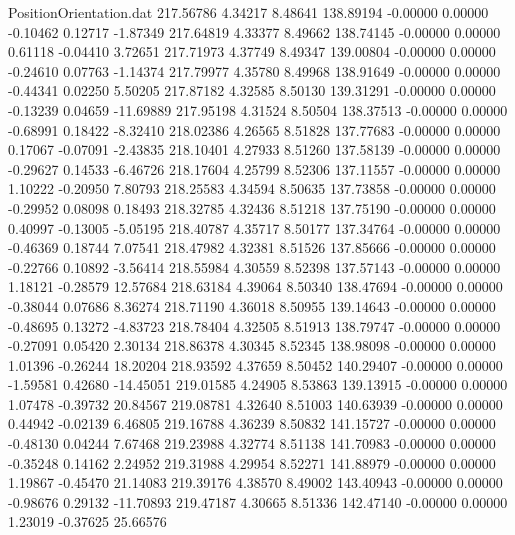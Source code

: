 \begin{filecontents}{PositionOrientation.dat}
 217.56786    4.34217    8.48641   138.89194   -0.00000    0.00000   -0.10462    0.12717   -1.87349
 217.64819    4.33377    8.49662   138.74145   -0.00000    0.00000    0.61118   -0.04410    3.72651
 217.71973    4.37749    8.49347   139.00804   -0.00000    0.00000   -0.24610    0.07763   -1.14374
 217.79977    4.35780    8.49968   138.91649   -0.00000    0.00000   -0.44341    0.02250    5.50205
 217.87182    4.32585    8.50130   139.31291   -0.00000    0.00000   -0.13239    0.04659  -11.69889
 217.95198    4.31524    8.50504   138.37513   -0.00000    0.00000   -0.68991    0.18422   -8.32410
 218.02386    4.26565    8.51828   137.77683   -0.00000    0.00000    0.17067   -0.07091   -2.43835
 218.10401    4.27933    8.51260   137.58139   -0.00000    0.00000   -0.29627    0.14533   -6.46726
 218.17604    4.25799    8.52306   137.11557   -0.00000    0.00000    1.10222   -0.20950    7.80793
 218.25583    4.34594    8.50635   137.73858   -0.00000    0.00000   -0.29952    0.08098    0.18493
 218.32785    4.32436    8.51218   137.75190   -0.00000    0.00000    0.40997   -0.13005   -5.05195
 218.40787    4.35717    8.50177   137.34764   -0.00000    0.00000   -0.46369    0.18744    7.07541
 218.47982    4.32381    8.51526   137.85666   -0.00000    0.00000   -0.22766    0.10892   -3.56414
 218.55984    4.30559    8.52398   137.57143   -0.00000    0.00000    1.18121   -0.28579   12.57684
 218.63184    4.39064    8.50340   138.47694   -0.00000    0.00000   -0.38044    0.07686    8.36274
 218.71190    4.36018    8.50955   139.14643   -0.00000    0.00000   -0.48695    0.13272   -4.83723
 218.78404    4.32505    8.51913   138.79747   -0.00000    0.00000   -0.27091    0.05420    2.30134
 218.86378    4.30345    8.52345   138.98098   -0.00000    0.00000    1.01396   -0.26244   18.20204
 218.93592    4.37659    8.50452   140.29407   -0.00000    0.00000   -1.59581    0.42680  -14.45051
 219.01585    4.24905    8.53863   139.13915   -0.00000    0.00000    1.07478   -0.39732   20.84567
 219.08781    4.32640    8.51003   140.63939   -0.00000    0.00000    0.44942   -0.02139    6.46805
 219.16788    4.36239    8.50832   141.15727   -0.00000    0.00000   -0.48130    0.04244    7.67468
 219.23988    4.32774    8.51138   141.70983   -0.00000    0.00000   -0.35248    0.14162    2.24952
 219.31988    4.29954    8.52271   141.88979   -0.00000    0.00000    1.19867   -0.45470   21.14083
 219.39176    4.38570    8.49002   143.40943   -0.00000    0.00000   -0.98676    0.29132  -11.70893
 219.47187    4.30665    8.51336   142.47140   -0.00000    0.00000    1.23019   -0.37625   25.66576

\end{filecontents}
